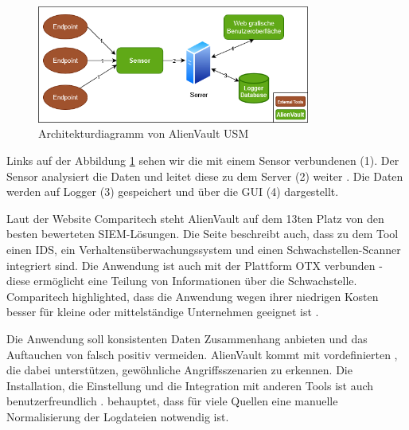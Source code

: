\begin{figure}[H]
   \centering
   \includegraphics[width=0.8\textwidth]{assets/AlienVault.drawio.png}
   \caption[Architekturdiagramm von AlienVault \gls{USM}]
   {Architekturdiagramm von AlienVault \gls{USM}}
   \label{fig:AlienVault_Architektur}
   \centering
\end{figure}



Links auf der Abbildung \ref{fig:AlienVault_Architektur} sehen wir die mit einem Sensor verbundenen  (1). Der Sensor analysiert die Daten und leitet diese zu dem Server (2) weiter \citep{AV_Sensor}. Die Daten werden auf Logger (3) gespeichert und über die \gls{GUI} (4) dargestellt.

Laut der Website Comparitech steht AlienVault auf dem 13ten Platz von den besten bewerteten \gls{SIEM}-Lösungen. Die Seite beschreibt auch, dass zu dem Tool einen \gls{IDS}, ein Verhaltensüberwachungssystem und einen Schwachstellen-Scanner integriert sind. Die Anwendung ist auch mit der Plattform \gls{OTX} verbunden - diese ermöglicht eine Teilung von Informationen über die Schwachstelle. Comparitech highlighted, dass die Anwendung wegen ihrer niedrigen Kosten besser für kleine oder mittelständige Unternehmen geeignet ist \citep{comparitech_SIEM}.

Die Anwendung soll konsistenten Daten Zusammenhang anbieten und das Auftauchen von \gls{falsch positiv} vermeiden. AlienVault kommt mit vordefinierten , die dabei unterstützen, gewöhnliche Angriffsszenarien zu erkennen. Die Installation, die Einstellung und die Integration mit anderen Tools ist auch benutzerfreundlich \citep{Gomes_AV}. \cite{Nabil_AV} behauptet, dass für viele Quellen eine manuelle Normalisierung der Logdateien notwendig ist.

